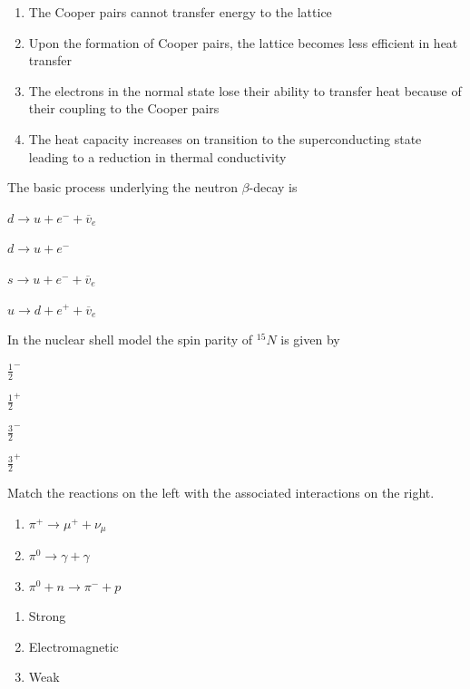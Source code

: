 \documentclass{exam}
\begin{document}
\begin{questions}
\begin{enumerate}
	\item The Cooper pairs cannot transfer energy to the lattice
	\item Upon the formation of Cooper pairs, the lattice becomes less efficient in heat transfer
	\item The electrons in the normal state lose their ability to transfer heat because of their coupling to the Cooper pairs
	\item The heat capacity increases on transition to the superconducting state leading to a reduction in thermal conductivity
\end{enumerate}

\question The basic process underlying the neutron $\beta$-decay is\hfill{}

\begin{enumerate} \begin{multicols}{4}
	\item $d \rightarrow u + e^{-} + \overline{v}_{e}$
	\item $d \rightarrow u + e^{-}$
	\item $s \rightarrow u + e^{-} + \overline{v}_{e}$
	\item $u \rightarrow d + e^{+} + \overline{v}_{e}$
\end{multicols} \end{enumerate}

\question In the nuclear shell model the spin parity of ${}^{15}N$ is given by\hfill{}

\begin{enumerate} \begin{multicols}{4}
	\item $\frac{1}{2}^{-}$ \item $\frac{1}{2}^{+}$ \item $\frac{3}{2}^{-}$ \item $\frac{3}{2}^{+}$
\end{multicols} \end{enumerate}

\question Match the reactions on the left with the associated interactions on the right.\hfill{}

\begin{multicols}{2}
\begin{enumerate}[label=(\arabic*)]
		\item $\pi^{+} \rightarrow \mu^{+} + \nu_{\mu}$
		\item $\pi^{0} \rightarrow \gamma + \gamma$
		\item $\pi^{0} + n \rightarrow \pi^{-} + p$
	\end{enumerate}
\columnbreak
\begin{enumerate}[label=(\roman*)]
		\item Strong
		\item Electromagnetic
		\item Weak
	\end{enumerate}
\end{multicols}


\end{questions}
\end{document}
